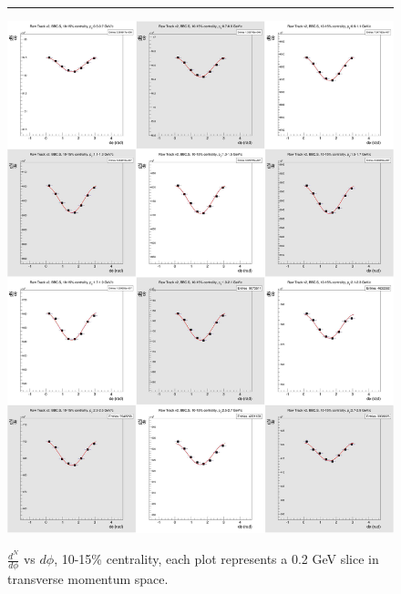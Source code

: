 \begin{figure}[H]
  \centering
  \caption[$\frac{dN}{d\phi}$ vs $d\phi$, 10-15\% centrality.]{$\frac{d^N}{d\phi}$ vs $d\phi$, 10-15\% centrality, each plot represents a 0.2 GeV slice in transverse momentum space.}
    \rule{35em}{0.5pt}
    \includegraphics[width=1\textwidth]{chargedtrackv2/htrkdphi2bbcs_2.jpg}  
  \label{fig:Ndphicent2}
\end{figure}
